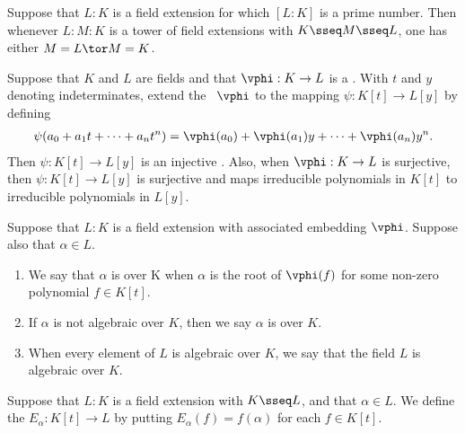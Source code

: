 \documentclass{article}
\begin{document}
  \begin{corollary}
    Suppose that $L:K$ is a field extension for which $[L: K]$ is a prime number.
    Then whenever $L : M : K$ is a tower of field extensions with $K \sseq M \sseq L$, one has either $M= L \tor M= K$.
  \end{corollary}

  \begin{proposition}
    Suppose that $K$ and $L$ are fields and that $\vphi : K \to L$ is a \homo. With $t$ and $y$ denoting indeterminates, extend the \homo~$ \vphi $ to the mapping $\psi: K[t] \to L[y]$ by defining \begin{align*}
      \psi(a_0 + a_1t+\cdots + a_n t^n) = \vphi(a_0) + \vphi(a_1)y+\cdots + \vphi(a_n)y^n.
    \end{align*}
    Then $ \psi:K[t]\to L[y] $ is an injective \homo. Also, when $ \vphi:K\to L $ is surjective, then $\psi: K[t]\to L[y]$ is surjective and maps irreducible polynomials in $K[t]$ to irreducible polynomials in $L[y]$.
  \end{proposition}

  \begin{definition}
    Suppose that $L: K$ is a field extension with associated embedding $ \vphi $.
    Suppose also that $\alpha\in L$. \begin{enumerate}[label=(\roman*)]
      \item We say that $ \alpha $ is  over K when $ \alpha $ is the root of $\vphi(f)$ for some non-zero polynomial $f \in K[t]$.
      \item If $\alpha$ is not algebraic over $K$, then we say $ \alpha $ is  over $K$.
      \item When every element of $L$ is algebraic over $K$, we say that the field $L$ is algebraic over $K$.
    \end{enumerate}
  \end{definition}

  \begin{definition}
    Suppose that $L: K$ is a field extension with $K \sseq L$, and that $ \alpha\in L $.
    We define the  $E_\alpha : K[t] \to L$ by putting $E_\alpha(f) = f(\alpha)$ for each $f \in K[t]$.
  \end{definition}
\end{document}
